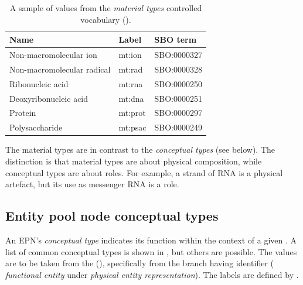 \begin{table}[htb]
  \centering
  \begin{tabular}{l>{\ttfamily}l>{\ttfamily}l}
    \toprule
    \textbf{Name}              & \textbf{\rmfamily Label} & \textbf{\rmfamily SBO term} \\
    \midrule
    Non-macromolecular ion     & mt:ion  & SBO:0000327\\
    Non-macromolecular radical & mt:rad  & SBO:0000328\\
    Ribonucleic acid           & mt:rna  & SBO:0000250\\
    Deoxyribonucleic acid       & mt:dna  & SBO:0000251\\
    Protein                    & mt:prot & SBO:0000297\\
    Polysaccharide             & mt:psac & SBO:0000249\\
    \bottomrule
  \end{tabular}
  \caption{A sample of values from the \emph{material types} controlled
    vocabulary ().}
  \label{tab:techref:material-types-cv}
\end{table}

The material types are in contrast to the \emph{conceptual types} (see
below).  The distinction is that material types are about physical
composition, while conceptual types are about roles.  For example, a
strand of RNA is a physical artefact, but its use as messenger RNA is
a role.


\subsection{Entity pool node conceptual types}
\label{sec:techref:conceptual-types-cv}

An EPN's \emph{conceptual type} indicates its function within the
context of a given \PD.  A list of common conceptual types is shown in
, but others are possible.  The values are to
be taken from the \sbo (\sbourl), specifically from the branch having
identifier  ($\!$\emph{functional entity} under
\emph{physical entity representation}).  The labels are defined by \SBGNPDLone.

